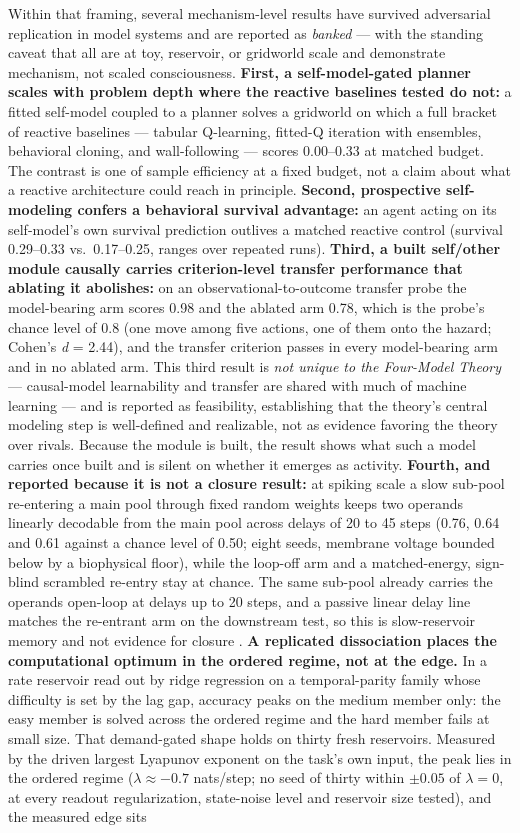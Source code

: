 \documentclass[12pt]{article}
\begin{document}
Within that framing, several mechanism-level results have survived adversarial replication in model systems and are reported as \emph{banked} --- with the standing caveat that all are at toy, reservoir, or gridworld scale and demonstrate mechanism, not scaled consciousness. \textbf{First, a self-model-gated planner scales with problem depth where the reactive baselines tested do not:} a fitted self-model coupled to a planner solves a gridworld on which a full bracket of reactive baselines --- tabular Q-learning, fitted-Q iteration with ensembles, behavioral cloning, and wall-following --- scores 0.00--0.33 at matched budget. The contrast is one of sample efficiency at a fixed budget, not a claim about what a reactive architecture could reach in principle. \textbf{Second, prospective self-modeling confers a behavioral survival advantage:} an agent acting on its self-model's own survival prediction outlives a matched reactive control (survival 0.29--0.33 vs.\ 0.17--0.25, ranges over repeated runs). \textbf{Third, a built self/other module causally carries criterion-level transfer performance that ablating it abolishes:} on an observational-to-outcome transfer probe the model-bearing arm scores 0.98 and the ablated arm 0.78, which is the probe's chance level of 0.8 (one move among five actions, one of them onto the hazard; Cohen's \emph{d} = 2.44), and the transfer criterion passes in every model-bearing arm and in no ablated arm. This third result is \emph{not unique to the Four-Model Theory} --- causal-model learnability and transfer are shared with much of machine learning --- and is reported as feasibility, establishing that the theory's central modeling step is well-defined and realizable, not as evidence favoring the theory over rivals. Because the module is built, the result shows what such a model carries once built and is silent on whether it emerges as activity. \textbf{Fourth, and reported because it is not a closure result:} at spiking scale a slow sub-pool re-entering a main pool through fixed random weights keeps two operands linearly decodable from the main pool across delays of 20 to 45 steps (0.76, 0.64 and 0.61 against a chance level of 0.50; eight seeds, membrane voltage bounded below by a biophysical floor), while the loop-off arm and a matched-energy, sign-blind scrambled re-entry stay at chance. The same sub-pool already carries the operands open-loop at delays up to 20 steps, and a passive linear delay line matches the re-entrant arm on the downstream test, so this is slow-reservoir memory and not evidence for closure \citep[\S4.5]{Gruber2026d}. \textbf{A replicated dissociation places the computational optimum in the ordered regime, not at the edge.} In a rate reservoir read out by ridge regression on a temporal-parity family whose difficulty is set by the lag gap, accuracy peaks on the medium member only: the easy member is solved across the ordered regime and the hard member fails at small size. That demand-gated shape holds on thirty fresh reservoirs. Measured by the driven largest Lyapunov exponent on the task's own input, the peak lies in the ordered regime ($\lambda \approx -0.7$ nats/step; no seed of thirty within $\pm 0.05$ of $\lambda = 0$, at every readout regularization, state-noise level and reservoir size tested), and the measured edge sits 
\end{document}
